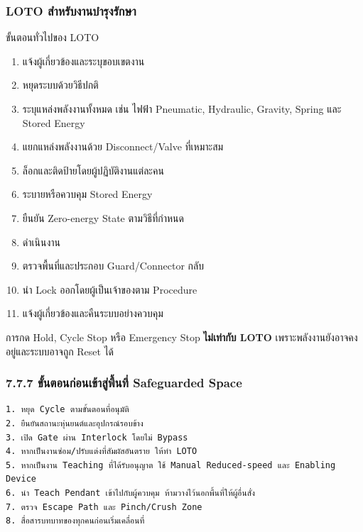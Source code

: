 \subsubsection{LOTO สำหรับงานบำรุงรักษา}

ขั้นตอนทั่วไปของ LOTO

\begin{enumerate}
    \item แจ้งผู้เกี่ยวข้องและระบุขอบเขตงาน
    \item หยุดระบบด้วยวิธีปกติ
    \item ระบุแหล่งพลังงานทั้งหมด เช่น ไฟฟ้า Pneumatic, Hydraulic, Gravity, Spring และ Stored Energy
    \item แยกแหล่งพลังงานด้วย Disconnect/Valve ที่เหมาะสม
    \item ล็อกและติดป้ายโดยผู้ปฏิบัติงานแต่ละคน
    \item ระบายหรือควบคุม Stored Energy
    \item ยืนยัน Zero-energy State ตามวิธีที่กำหนด
    \item ดำเนินงาน
    \item ตรวจพื้นที่และประกอบ Guard/Connector กลับ
    \item นำ Lock ออกโดยผู้เป็นเจ้าของตาม Procedure
    \item แจ้งผู้เกี่ยวข้องและคืนระบบอย่างควบคุม
\end{enumerate}

การกด Hold, Cycle Stop หรือ Emergency Stop \textbf{ไม่เท่ากับ LOTO} เพราะพลังงานยังอาจคงอยู่และระบบอาจถูก Reset ได้

\subsubsection{7.7.7 ขั้นตอนก่อนเข้าสู่พื้นที่ Safeguarded Space}

\begin{verbatim}
1. หยุด Cycle ตามขั้นตอนที่อนุมัติ
2. ยืนยันสถานะหุ่นยนต์และอุปกรณ์รอบข้าง
3. เปิด Gate ผ่าน Interlock โดยไม่ Bypass
4. หากเป็นงานซ่อม/ปรับแต่งที่สัมผัสอันตราย ให้ทำ LOTO
5. หากเป็นงาน Teaching ที่ได้รับอนุญาต ใช้ Manual Reduced-speed และ Enabling Device
6. นำ Teach Pendant เข้าไปกับผู้ควบคุม ห้ามวางไว้นอกพื้นที่ให้ผู้อื่นสั่ง
7. ตรวจ Escape Path และ Pinch/Crush Zone
8. สื่อสารบทบาทของทุกคนก่อนเริ่มเคลื่อนที่
\end{verbatim}

